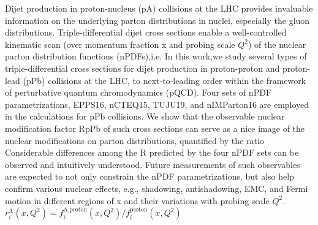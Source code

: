 \begin{abstract*}

Dijet production in proton-nucleus (pA) collisions at the LHC provides invaluable information on the
underlying parton distributions in nuclei, especially the gluon distributions. Triple-differential dijet cross
sections enable a well-controlled kinematic scan (over momentum fraction x and probing scale $Q^2$) of the
nuclear parton distribution functions (nPDFs),i.e.
In this work,we study several types of triple-differential cross sections for dijet production in proton-proton and proton-lead (pPb) collisions at the
LHC, to next-to-leading order within the framework of perturbative quantum chromodynamics (pQCD).
Four sets of nPDF parametrizations, EPPS16, nCTEQ15, TUJU19, and nIMParton16 are employed in the
calculations for pPb collisions. 
We show that the observable nuclear modification factor RpPb of such cross
sections can serve as a nice image of the nuclear modifications on parton distributions, quantified by the
ratio 
Considerable differences among the R predicted by the four nPDF sets can be observed and intuitively understood. Future measurements of such observables are expected to not only constrain the nPDF parametrizations, but also help confirm various nuclear effects, e.g., shadowing, antishadowing, EMC, and Fermi motion in different regions of x and their variations with probing scale $Q^2$.
$r^{\textrm{A}}_i(x,Q^2)\!=\!f^\textrm{A,proton}_i(x,Q^2)/f^\textrm{proton}_i(x,Q^2)$


\end{abstract*}
